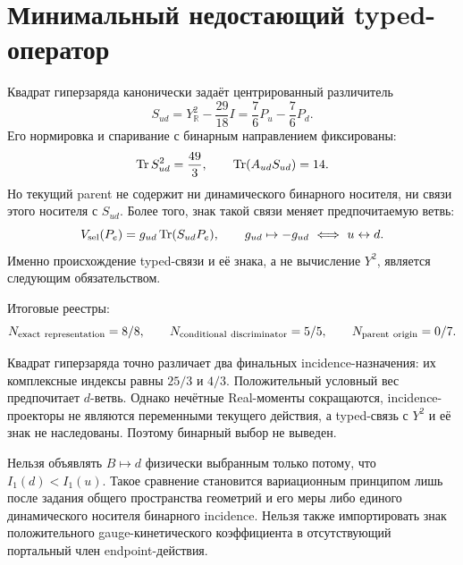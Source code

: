 \section{Минимальный недостающий typed-оператор}

Квадрат гиперзаряда канонически задаёт центрированный различитель
\begin{equation}
 S_{ud}=Y_{\mathbb R}^{2}-\frac{29}{18}I
 =\frac76P_u-\frac76P_d.
 \label{eq:v8-up-down-selector-centered-discriminator}
\end{equation}
Его нормировка и спаривание с бинарным направлением фиксированы:
\begin{equation}
 \operatorname{Tr} S_{ud}^{2}=\frac{49}{3},
 \qquad \operatorname{Tr}(A_{ud}S_{ud})=14.
 \label{eq:v8-up-down-selector-discriminator-norm}
\end{equation}
Но текущий parent не содержит ни динамического бинарного носителя, ни
связи этого носителя с $S_{ud}$. Более того, знак такой связи меняет
предпочитаемую ветвь:
\begin{equation}
 V_{\rm sel}(P_e)=g_{ud}\operatorname{Tr}(S_{ud}P_e),\qquad
 g_{ud}\mapsto-g_{ud}\ \Longleftrightarrow\ u\leftrightarrow d.
 \label{eq:v8-up-down-selector-missing-coupling-sign}
\end{equation}
Именно происхождение typed-связи и её знака, а не вычисление $Y^2$, является
следующим обязательством.

Итоговые реестры:
\begin{equation}
 N_{\rm exact\ representation}=8/8,\qquad
 N_{\rm conditional\ discriminator}=5/5,\qquad
 N_{\rm parent\ origin}=0/7.
 \label{eq:v8-up-down-selector-ledgers}
\end{equation}

\begin{theorem}
Квадрат гиперзаряда точно различает два финальных incidence-назначения:
их комплексные индексы равны $25/3$ и $4/3$. Положительный условный вес
предпочитает $d$-ветвь. Однако нечётные Real-моменты сокращаются, incidence-
проекторы не являются переменными текущего действия, а typed-связь с
$Y^2$ и её знак не наследованы. Поэтому бинарный выбор не выведен.
\end{theorem}

\begin{nogocriterion}
Нельзя объявлять $B\mapsto d$ физически выбранным только потому, что
$I_1(d)<I_1(u)$. Такое сравнение становится вариационным принципом лишь
после задания общего пространства геометрий и его меры либо единого
динамического носителя бинарного incidence. Нельзя также импортировать знак
положительного gauge-кинетического коэффициента в отсутствующий портальный
член endpoint-действия.
\end{nogocriterion}

